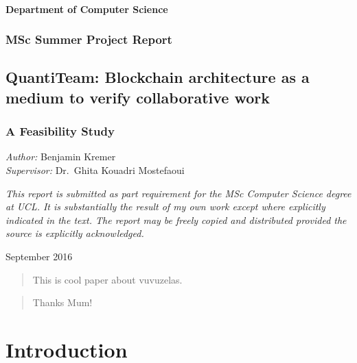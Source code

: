 \subsubsection{Department of Computer
Science}\label{department-of-computer-science}

\subsection{MSc Summer Project Report}\label{msc-summer-project-report}

\section{QuantiTeam: Blockchain architecture as a medium to verify
collaborative
work}\label{quantiteam-blockchain-architecture-as-a-medium-to-verify-collaborative-work}

\subsection{A Feasibility Study}\label{a-feasibility-study}

\emph{Author:} Benjamin Kremer\\
\emph{Supervisor:} Dr.~Ghita Kouadri Mostefaoui

\emph{This report is submitted as part requirement for the MSc Computer
Science degree at UCL. It is substantially the result of my own work
except where explicitly indicated in the text. The report may be freely
copied and distributed provided the source is explicitly acknowledged.}

September 2016

\begin{abstract}
 This is cool paper about vuvuzelas.
\end{abstract}

\renewcommand{\abstractname}{Acknowledgements}
\begin{abstract}
 Thanks Mum!
\end{abstract}

\setcounter{tocdepth}{3}

\tableofcontents
\listoffigures
\listoftables


\chapter{Introduction}

